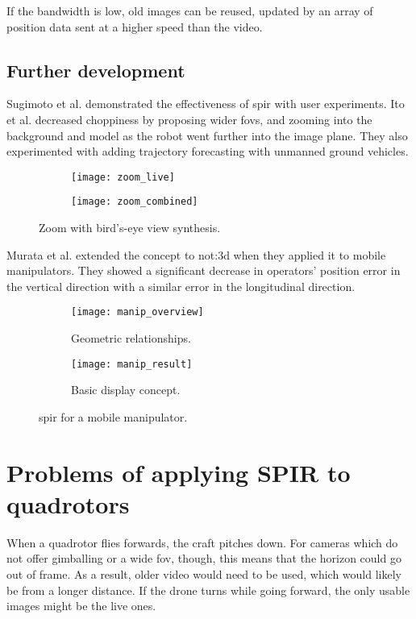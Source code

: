 If the bandwidth is low, old images can be reused, updated by an array of position data sent at a higher speed than the video.

\subsection{Further development}
Sugimoto et al. demonstrated the effectiveness of \gls{spir} with user experiments.\cite{sugimoto2005}
Ito et al. decreased choppiness by proposing wider \glspl{fov}, and zooming into the background and model as the robot went further into the image plane.\cite{ito2008}
They also experimented with adding trajectory forecasting with unmanned ground vehicles.

\begin{figure}[h]
  \centering
  \begin{subfigure}[b]{0.45\textwidth}
    \texttt{[image: zoom\_live]}
  \end{subfigure}
  \hfill
  \begin{subfigure}[b]{0.45\textwidth}
    \texttt{[image: zoom\_combined]}
  \end{subfigure}
  \caption{Zoom with bird's-eye view synthesis.\cite{ito2008}}
  \label{fig:zoom_results}
\end{figure}

Murata et al. extended the concept to \gls{not:3d} when they applied it to mobile manipulators.\cite{murata2014}
They showed a significant decrease in operators' position error in the vertical direction with a similar error in the longitudinal direction.

\begin{figure}[h]
  \centering
  \begin{subfigure}[b]{0.45\textwidth}
    \texttt{[image: manip\_overview]}
    \caption{Geometric relationships.}
  \end{subfigure}
  \hfill
  \begin{subfigure}[b]{0.45\textwidth}
    \texttt{[image: manip\_result]}
    \caption{Basic display concept.}
  \end{subfigure}
  \caption{\gls{spir} for a mobile manipulator.\cite{murata2014}}
  \label{fig:manip_results}
\end{figure}

\section{Problems of applying SPIR to quadrotors}
When a quadrotor flies forwards, the craft pitches down.
For cameras which do not offer gimballing or a wide \gls{fov}, though, this means that the horizon could go out of frame.
As a result, older video would need to be used, which would likely be from a longer distance.
If the drone turns while going forward, the only usable images might be the live ones.

